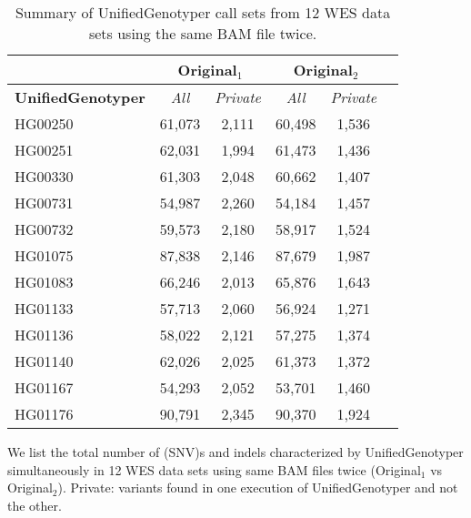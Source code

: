 \begin{table}[htb]
\caption{ Summary of UnifiedGenotyper call sets from 12 WES data sets using the same BAM file twice.}
\begin{center}
\begin{tabular}{|l||c|c|c|c|c|}
\hline
{\bf } & \multicolumn{2}{|c|}{Original$_1$} & \multicolumn{2}{|c|}{Original$_2$}\\
\hline
{\bf UnifiedGenotyper} & {\it All} & {\it Private} & {\it All} & {\it Private} \\
\hline
HG00250 & 61,073 & 2,111 & 60,498 & 1,536 \\
HG00251 & 62,031 & 1,994 & 61,473 & 1,436 \\
HG00330 & 61,303 & 2,048 & 60,662 & 1,407 \\
HG00731 & 54,987 & 2,260 & 54,184 & 1,457 \\
HG00732 & 59,573 & 2,180 & 58,917 & 1,524 \\
HG01075 & 87,838 & 2,146 & 87,679 & 1,987 \\
HG01083 & 66,246 & 2,013 & 65,876 & 1,643 \\
HG01133 & 57,713 & 2,060 & 56,924 & 1,271 \\
HG01136 & 58,022 & 2,121 & 57,275 & 1,374 \\
HG01140 & 62,026 & 2,025 & 61,373 & 1,372 \\
HG01167 & 54,293 & 2,052 & 53,701 & 1,460 \\
HG01176 & 90,791 & 2,345 & 90,370 & 1,924 \\
\hline
\end{tabular}
\end{center}
{\footnotesize We list the total number of (SNV)s and indels characterized by UnifiedGenotyper simultaneously in 12 WES data sets using same BAM files twice (Original$_1$ vs Original$_2$).
Private: variants found in one execution of UnifiedGenotyper and not the other.}
\label{supptab:orig-vs-orig2-multiple-ug}
\end{table}
